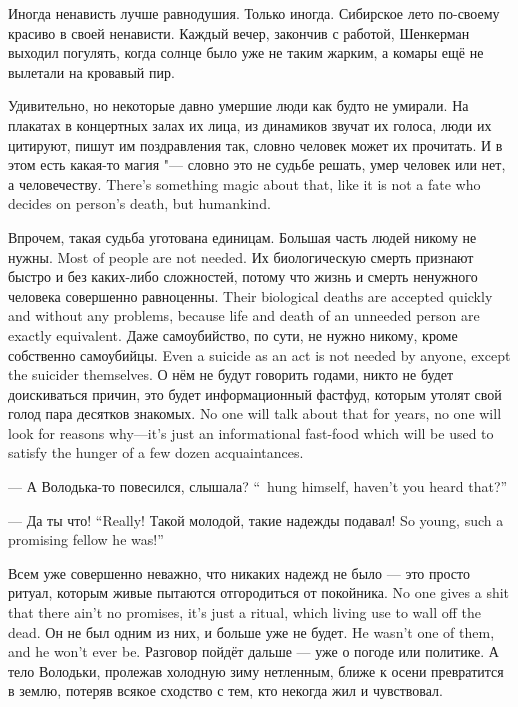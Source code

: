Иногда ненависть лучше равнодушия.
Только иногда.
Сибирское лето по-своему красиво в своей ненависти.
Каждый вечер, закончив с работой, Шенкерман выходил погулять, когда солнце было уже не таким жарким, а комары ещё не вылетали на кровавый пир.

Удивительно, но некоторые давно умершие люди как будто не умирали.
На плакатах в концертных залах их лица, из динамиков звучат их голоса, люди их цитируют, пишут им поздравления так, словно человек может их прочитать.
{И в этом есть какая-то магия "--- словно это не судьбе решать, умер человек или нет, а человечеству.}
{There's something magic about that, like it is not a fate who decides on person's death, but humankind.}

Впрочем, такая судьба уготована единицам.
{Большая часть людей никому не нужны.}
{Most of people are not needed.}
{Их биологическую смерть признают быстро и без каких-либо сложностей, потому что жизнь и смерть ненужного человека совершенно равноценны.}
{Their biological deaths are accepted quickly and without any problems, because life and death of an unneeded person are exactly equivalent.}
{Даже самоубийство, по сути, не нужно никому, кроме собственно самоубийцы.}
{Even a suicide as an act is not needed by anyone, except the suicider themselves.}
{О нём не будут говорить годами, никто не будет доискиваться причин, это будет информационный фастфуд, которым утолят свой голод пара десятков знакомых.}
{No one will talk about that for years, no one will look for reasons why---it's just an informational fast-food which will be used to satisfy the hunger of a few dozen acquaintances.}

{--- А Володька-то повесился, слышала?}
{``\Volodka\ hung himself, haven't you heard that?''}

{--- Да ты что!}
{``Really!}
{Такой молодой, такие надежды подавал!}
{So young, such a promising fellow he was!''}

{Всем уже совершенно неважно, что никаких надежд не было --- это просто ритуал, которым живые пытаются отгородиться от покойника.}
{No one gives a shit that there ain't no promises, it's just a ritual, which living use to wall off the dead.}
{Он не был одним из них, и больше уже не будет.}
{He wasn't one of them, and he won't ever be.}
Разговор пойдёт дальше --- уже о погоде или политике.
А тело Володьки, пролежав холодную зиму нетленным, ближе к осени превратится в землю, потеряв всякое сходство с тем, кто некогда жил и чувствовал.

